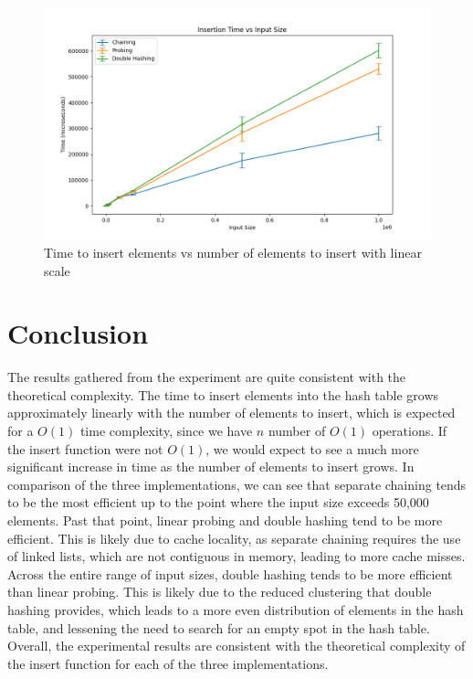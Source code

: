 \documentclass{article}
\begin{document}
\begin{figure}[H]
    \centering
    \includegraphics[width=\textwidth]{../plotting/plot_linear.png}
    \caption{Time to insert elements vs number of elements to insert with linear scale}
\end{figure}

\section{Conclusion}
The results gathered from the experiment are quite consistent with the theoretical complexity.
The time to insert elements into the hash table grows approximately linearly with the number of elements to insert, which is expected for a $O(1)$ time complexity, since we have $n$ number of $O(1)$ operations.
If the insert function were not $O(1)$, we would expect to see a much more significant increase in time as the number of elements to insert grows.
In comparison of the three implementations, we can see that separate chaining tends to be the most efficient up to the point where the input size exceeds 50,000 elements.
Past that point, linear probing and double hashing tend to be more efficient.
This is likely due to cache locality, as separate chaining requires the use of linked lists, which are not contiguous in memory, leading to more cache misses.
Across the entire range of input sizes, double hashing tends to be more efficient than linear probing.
This is likely due to the reduced clustering that double hashing provides, which leads to a more even distribution of elements in the hash table, and lessening the need to search for an empty spot in the hash table.
Overall, the experimental results are consistent with the theoretical complexity of the insert function for each of the three implementations.
\end{document}
